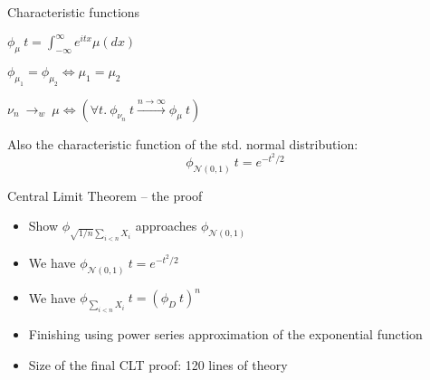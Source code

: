 \documentclass[usepdftitle=false]{beamer}
\begin{document}
\begin{frame}{Characteristic functions} %

\begin{definition}%
\vspace{-1em}
\begin{center} $ \displaystyle \phi_\mu~t = \int_{-\infty}^{\infty} e^{itx} \mu(dx) $ \end{center}
\end{definition}

\begin{theorem}
\vspace{-1em}
\begin{center} $ \phi_{\mu_1} = \phi_{\mu_2} \Leftrightarrow \mu_1 = \mu_2 $ \end{center} 
\end{theorem}

\begin{theorem}
\vspace{-1em}
\begin{center} $ \nu_n ~{\longrightarrow}_w~ \mu \Leftrightarrow
  (\forall t.\ \phi_{\nu_n}~t \xrightarrow{n \to \infty} \phi_\mu~t) $ \end{center}
\end{theorem}

Also the characteristic function of the std. normal distribution:
\[ \phi_{\mathcal{N}(0, 1)}~t = e^{-t^2/2}\]

\end{frame} %

\begin{frame}{Central Limit Theorem -- the proof} %
\begin{itemize}

  \item Show $\phi_{\sqrt{1/n} \sum_{i < n} X_i}$ approaches $\phi_{\mathcal{N}(0, 1)}$
    
  \item We have $\phi_{\mathcal{N}(0, 1)}~t = e^{-t^2/2}$
  
  \item We have $\phi_{\sum_{i < n} X_i}~t = (\phi_D~t)^n$ 
  
  \item Finishing using power series approximation of the exponential function
  
  \item Size of the final CLT proof: 120 lines of theory
\end{itemize}
\end{frame} %
\end{document}
